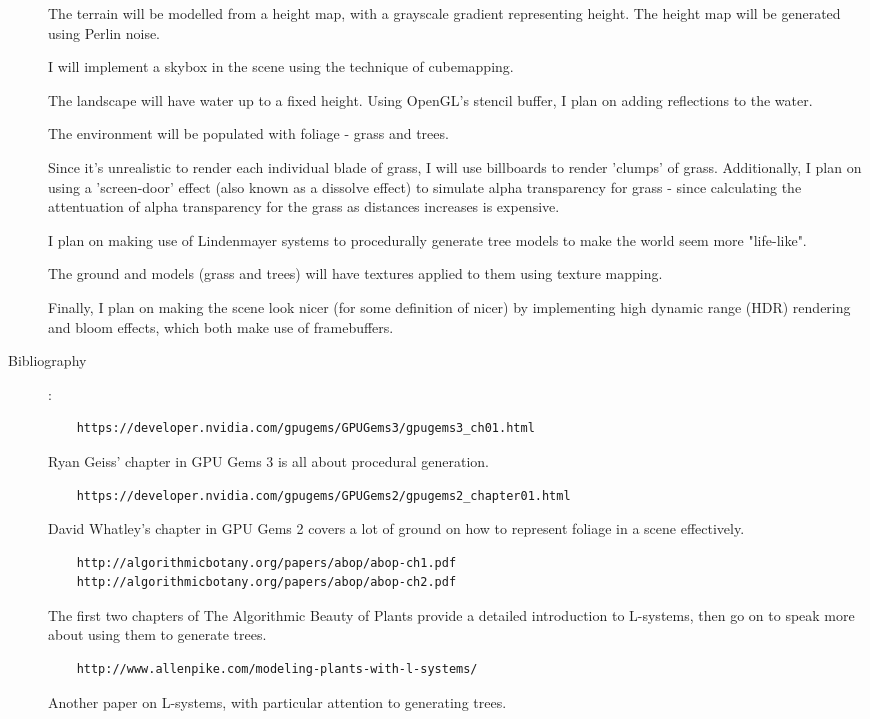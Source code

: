 \documentclass {article}
\begin{document}
\begin{description}
    The terrain will be modelled from a height map, with a grayscale gradient representing height. The height map will be generated using Perlin noise.

    I will implement a skybox in the scene using the technique of cubemapping.

    The landscape will have water up to a fixed height. Using OpenGL's stencil buffer, I plan on adding reflections to the water.

    The environment will be populated with foliage - grass and trees. 

    Since it's unrealistic to render each individual blade of grass, I will use billboards to render 'clumps' of grass. Additionally, I plan on using a 'screen-door' effect (also known as a dissolve effect) to simulate alpha transparency for grass - since calculating the attentuation of alpha transparency for the grass as distances increases is expensive. 

    I plan on making use of Lindenmayer systems to procedurally generate tree models to make the world seem more "life-like". 

    The ground and models (grass and trees) will have textures applied to them using texture mapping. 

    Finally, I plan on making the scene look nicer (for some definition of nicer) by implementing high dynamic range (HDR) rendering and bloom effects, which both make use of framebuffers.

\item[Bibliography]:\\

    \begin{verbatim}
    https://developer.nvidia.com/gpugems/GPUGems3/gpugems3_ch01.html
    \end{verbatim}
    Ryan Geiss' chapter in GPU Gems 3 is all about procedural generation.

    \begin{verbatim}
    https://developer.nvidia.com/gpugems/GPUGems2/gpugems2_chapter01.html
    \end{verbatim}
    David Whatley's chapter in GPU Gems 2 covers a lot of ground on how to represent foliage in a scene effectively.

    \begin{verbatim}
    http://algorithmicbotany.org/papers/abop/abop-ch1.pdf
    http://algorithmicbotany.org/papers/abop/abop-ch2.pdf
    \end{verbatim}
    The first two chapters of The Algorithmic Beauty of Plants provide a detailed introduction to L-systems, then go on to speak more about using them to generate trees.

    \begin{verbatim}
    http://www.allenpike.com/modeling-plants-with-l-systems/
    \end{verbatim}
    Another paper on L-systems, with particular attention to generating trees.

\end{description}
\newpage
\end{document}
